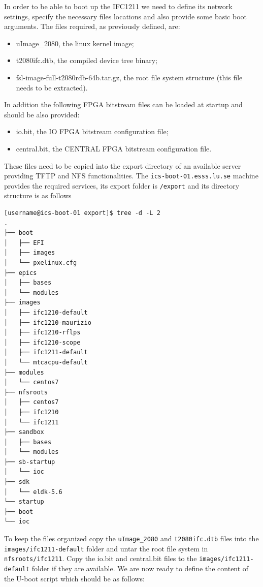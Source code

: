 \documentclass[11pt
  , a4paper
  , article
  , oneside
  , showtrims
]{memoir}
\begin{document}
In order to be able to boot up the IFC1211 we need to define its network settings, specify the necessary files locations and also provide some basic boot arguments.
The files required, as previously defined, are:
\begin{itemize}
	\item uImage\_2080, the linux kernel image;
	\item t2080ifc.dtb, the compiled device tree binary;
	\item fsl-image-full-t2080rdb-64b.tar.gz, the root file system structure (this file needs to be extracted).
\end{itemize}
In addition the following FPGA bitstream files can be loaded at startup and should be also provided:
\begin{itemize}
	\item io.bit, the IO FPGA bitstream configuration file;
	\item central.bit, the CENTRAL FPGA bitstream configuration file.
\end{itemize}
These files need to be copied into the export directory of an available server providing TFTP and NFS functionalities.
The \texttt{ics-boot-01.esss.lu.se} machine provides the required services, its export folder is \texttt{/export} and its directory structure is as follows
\begin{lstlisting}[style=termstyle]
[username@ics-boot-01 export]$ tree -d -L 2
.
├── boot
│   ├── EFI
│   ├── images
│   └── pxelinux.cfg
├── epics
│   ├── bases
│   └── modules
├── images
│   ├── ifc1210-default
│   ├── ifc1210-maurizio
│   ├── ifc1210-rflps
│   ├── ifc1210-scope
│   ├── ifc1211-default
│   └── mtcacpu-default
├── modules
│   └── centos7
├── nfsroots
│   ├── centos7
│   ├── ifc1210
│   └── ifc1211
├── sandbox
│   ├── bases
│   └── modules
├── sb-startup
│   └── ioc
├── sdk
│   └── eldk-5.6
└── startup
├── boot
└── ioc
\end{lstlisting}

To keep the files organized copy the \texttt{uImage\_2080} and \texttt{t2080ifc.dtb} files into the \texttt{images/ifc1211-default} folder and untar the root file system in \texttt{nfsroots/ifc1211}.
Copy the io.bit and central.bit files to the \texttt{images/ifc1211-default} folder if they are available.
We are now ready to define the content of the U-boot script which should be as follows:
\end{document}
